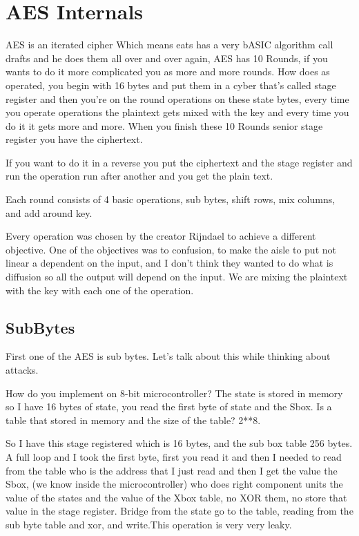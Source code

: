 \section{AES Internals}
AES is an iterated cipher Which means eats has a very bASIC algorithm call
drafts and he does them all over and over again, AES has 10 Rounds, if you wants
to do it more complicated you as more and more rounds. How does as operated, you
begin with 16 bytes and put them in a cyber that's called stage register and
then you're on the round operations on these state bytes, every time you operate
operations the plaintext gets mixed with the key and every time you do it it
gets more and more. When you finish these 10 Rounds senior stage register you
have the ciphertext.

If you want to do it in a reverse you put the ciphertext and the stage register
and run the operation run after another and you get the plain text.

Each round consists of 4 basic operations, sub bytes, shift rows, mix columns,
and add around key.

Every operation was chosen by the creator Rijndael to achieve a different
objective. One of the objectives was to confusion, to make the aisle to put not
linear a dependent on the input, and I don't think they wanted to do what is
diffusion so all the output will depend on the input. We are mixing the
plaintext with the key with each one of the operation.

\subsection{SubBytes}
First one of the AES is sub bytes. Let's talk about this while thinking about
attacks. 

How do you implement on 8-bit microcontroller? The state is stored in memory so
I have 16 bytes of state, you read the first byte of state and the Sbox. Is a
table that stored in memory and the size of the table? 2**8. 

So I have this stage registered which is 16 bytes, and the sub box table 256
bytes. A full loop and I took the first byte, first you read it and then I
needed to read from the table who is the address that I just read and then I get
the value the Sbox, (we know inside the microcontroller) who does right
component units the value of the states and the value of the Xbox table, no XOR
them, no store that value in the stage register. Bridge from the state go to the
table, reading from the sub byte table and xor, and write.This operation is very
very leaky.

